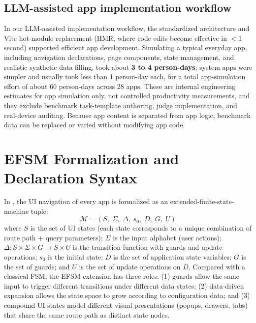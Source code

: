 \subsection{LLM-assisted app implementation workflow}

In our LLM-assisted implementation workflow, the standardized architecture and Vite hot-module replacement (HMR, where code edits become effective in $<$1 second) supported efficient app development. Simulating a typical everyday app, including navigation declarations, page components, state management, and realistic synthetic data filling, took about \textbf{3 to 4 person-days}; system apps were simpler and usually took less than 1 person-day each, for a total app-simulation effort of about 60 person-days across 28 apps. These are internal engineering estimates for app simulation only, not controlled productivity measurements, and they exclude benchmark task-template authoring, judge implementation, and real-device auditing. Because app content is separated from app logic, benchmark data can be replaced or varied without modifying app code.


\section{EFSM Formalization and Declaration Syntax}\label{app:efsm}

In \sys{}, the UI navigation of every app is formalized as an extended-finite-state-machine tuple:
\begin{equation*}
  \mathcal{M} = (S,\; \Sigma,\; \Delta,\; s_0,\; D,\; G,\; U)
\end{equation*}
where $S$ is the set of UI states (each state corresponds to a unique combination of route path + query parameters); $\Sigma$ is the input alphabet (user actions); $\Delta: S \times \Sigma \times G \to S \times U$ is the transition function with guards and update operations; $s_0$ is the initial state; $D$ is the set of application state variables; $G$ is the set of guards; and $U$ is the set of update operations on $D$. Compared with a classical FSM, the EFSM extension has three roles: (1) guards allow the same input to trigger different transitions under different data states; (2) data-driven expansion allows the state space to grow according to configuration data; and (3) compound UI states model different visual presentations (popups, drawers, tabs) that share the same route path as distinct state nodes.

